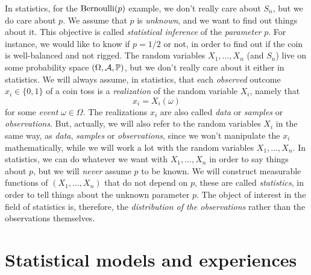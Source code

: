 In statistics, for the $\operatorname{Bernoulli}(p)$ example, we don't really care about $S_n$, but we do care about $p$.
We assume that $p$ is \emph{unknown}, and we want to find out things about it.
This objective is called \emph{statistical inference} of the \emph{parameter} $p$.
For instance, we would like to know if $p=1/2$ or not, in order to find out if the coin is well-balanced and not rigged.
The random variables $X_1, \ldots, X_n$ (and $S_n$) live on some probability space $(\Omega, \operatorname{{\mathcal A}}, \mathbb P)$, but we don't really care about it either in statistics.
We will always assume, in statistics, that each \emph{observed} outcome $x_i \in \{ 0, 1 \}$ of a coin toss is a \emph{realization} of the random variable $X_i$, namely that
\begin{equation*}
	x_i = X_i(\omega)
\end{equation*}
for some \emph{event} $\omega \in \Omega$.
The realizations $x_i$ are also called \emph{data} or \emph{samples} or \emph{observations}.
But, actually, we will also refer to the random variables $X_i$ in the same way, as \emph{data}, \emph{samples} or \emph{observations}, since we won't manipulate the $x_i$ mathematically,%
%
while we will work a lot with the random variables $X_1, \ldots, X_n$.
In statistics, we can do whatever we want with $X_1, \ldots, X_n$ in order to say things about $p$, but we will \emph{never} assume $p$ to be known.%
We will construct measurable functions of $(X_1, \ldots, X_n)$ that do not depend on $p$, these are called \emph{statistics}, in order to tell things about the unknown parameter $p$.
The object of interest in the field of statistics is, therefore, the \emph{distribution of the observations} rather than the observations themselves.


\section{Statistical models and experiences} %
\label{sec:statistical_models_and_experiences}

